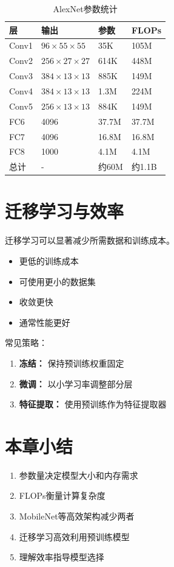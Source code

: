 \begin{table}[h]
    \centering
    \caption{AlexNet参数统计}
    \begin{tabular}{L{2cm} L{2.5cm} L{2cm} L{2cm}}
        \toprule
        \textbf{层} & \textbf{输出} & \textbf{参数} & \textbf{FLOPs} \\
        \midrule
        Conv1 & $96\times55\times55$ & 35K & 105M \\
        Conv2 & $256\times27\times27$ & 614K & 448M \\
        Conv3 & $384\times13\times13$ & 885K & 149M \\
        Conv4 & $384\times13\times13$ & 1.3M & 224M \\
        Conv5 & $256\times13\times13$ & 884K & 149M \\
        FC6 & 4096 & 37.7M & 37.7M \\
        FC7 & 4096 & 16.8M & 16.8M \\
        FC8 & 1000 & 4.1M & 4.1M \\
        \midrule
        总计 & - & 约60M & 约1.1B \\
        \bottomrule
    \end{tabular}
\end{table}

\section{迁移学习与效率}

迁移学习可以显著减少所需数据和训练成本。

\begin{properties}[迁移学习优势]
\begin{itemize}
    \item 更低的训练成本
    \item 可使用更小的数据集
    \item 收敛更快
    \item 通常性能更好
\end{itemize}
\end{properties}

常见策略：
\begin{enumerate}
    \item \textbf{冻结：} 保持预训练权重固定
    \item \textbf{微调：} 以小学习率调整部分层
    \item \textbf{特征提取：} 使用预训练作为特征提取器
\end{enumerate}

\section{本章小结}

\begin{enumerate}
    \item 参数量决定模型大小和内存需求
    \item FLOPs衡量计算复杂度
    \item MobileNet等高效架构减少两者
    \item 迁移学习高效利用预训练模型
    \item 理解效率指导模型选择
\end{enumerate}
